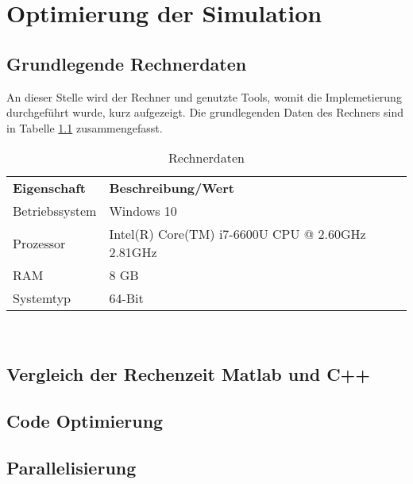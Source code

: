\chapter{Optimierung der Simulation}
\section{Grundlegende Rechnerdaten}
An dieser Stelle wird der Rechner und genutzte Tools, womit die Implemetierung durchgeführt wurde, kurz aufgezeigt. Die grundlegenden Daten des Rechners sind in Tabelle \ref{tab:Rechnerdaten} zusammengefasst.
\begin{table}[h]
	\centering	\begin{tabular}{l p{10cm}}
		\textbf{Eigenschaft} & \textbf{Beschreibung/Wert}\\
		Betriebssystem & Windows 10\\
		Prozessor & Intel(R) Core(TM) i7-6600U CPU @ 2.60GHz 2.81GHz\\
		RAM & 8 GB\\
		Systemtyp & 64-Bit 
	\end{tabular}
	\caption{Rechnerdaten}
	\label{tab:Rechnerdaten}
\end{table}\\
\section{Vergleich der Rechenzeit Matlab und C++}
\section{Code Optimierung}
\section{Parallelisierung}